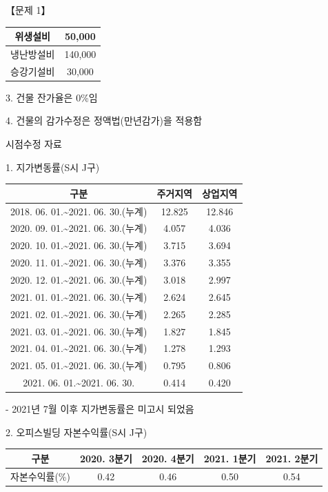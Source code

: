 \begin{longquestion}{【문제 1】}
{\begin{tabular}{|c|c|}
위생설비 & 50,000 \\\hline
냉난방설비 & 140,000 \\\hline
승강기설비 & 30,000 \\\hline
\end{tabular}\par}
3. 건물 잔가율은 0\%임 \par
4. 건물의 감가수정은 정액법(만년감가)을 적용함 \par
\medskip{} 시점수정 자료 \par
1. 지가변동률(S시 J구) \par
{\small\centering
\begin{tabular}{|c|c|c|}\hline
구분 & 주거지역 & 상업지역 \\\hline
2018. 06. 01.\textasciitilde{}2021. 06. 30.(누계) & 12.825 & 12.846 \\\hline
2020. 09. 01.\textasciitilde{}2021. 06. 30.(누계) & 4.057 & 4.036 \\\hline
2020. 10. 01.\textasciitilde{}2021. 06. 30.(누계) & 3.715 & 3.694 \\\hline
2020. 11. 01.\textasciitilde{}2021. 06. 30.(누계) & 3.376 & 3.355 \\\hline
2020. 12. 01.\textasciitilde{}2021. 06. 30.(누계) & 3.018 & 2.997 \\\hline
2021. 01. 01.\textasciitilde{}2021. 06. 30.(누계) & 2.624 & 2.645 \\\hline
2021. 02. 01.\textasciitilde{}2021. 06. 30.(누계) & 2.265 & 2.285 \\\hline
2021. 03. 01.\textasciitilde{}2021. 06. 30.(누계) & 1.827 & 1.845 \\\hline
2021. 04. 01.\textasciitilde{}2021. 06. 30.(누계) & 1.278 & 1.293 \\\hline
2021. 05. 01.\textasciitilde{}2021. 06. 30.(누계) & 0.795 & 0.806 \\\hline
2021. 06. 01.\textasciitilde{}2021. 06. 30. & 0.414 & 0.420 \\\hline
\end{tabular}\par}
- 2021년 7월 이후 지가변동률은 미고시 되었음 \par
2. 오피스빌딩 자본수익률(S시 J구) \par
{\small\centering
\begin{tabular}{|c|c|c|c|c|}\hline
구분 & 2020. 3분기 & 2020. 4분기 & 2021. 1분기 & 2021. 2분기 \\\hline
자본수익률(\%) & 0.42 & 0.46 & 0.50 & 0.54 \\\hline

\end{tabular}}
\end{longquestion}
